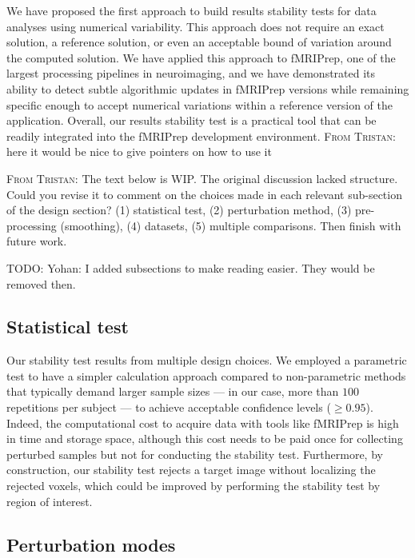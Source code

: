 \documentclass[lettersize,journal]{IEEEtran}
\newcommand{\TODO}[1]{\color{red}\textsc{TODO:} #1\color{black}\xspace}
\newcommand{\TG}[1]{\color{orange}\textsc{From Tristan:} #1\color{black}\xspace}
\newcommand{\fmriprep}{fMRIPrep\xspace}
\begin{document}

We have proposed the first approach to build results stability tests for data analyses using numerical variability. This approach does not require an exact solution, a reference solution, or even an acceptable bound of variation around the computed solution. We have applied this approach to \fmriprep, one of the largest processing pipelines in neuroimaging, and we have demonstrated its ability to detect subtle algorithmic updates in \fmriprep versions while remaining specific enough to accept numerical variations within a reference version of the application. Overall, our results stability test is a practical tool that can be readily integrated into the \fmriprep development environment. \TG{here it would be nice to give pointers on how to use it}

\TG{The text below is WIP. The original discussion lacked structure. Could you revise it to comment on the choices made in each relevant sub-section of the design section? (1) statistical test, (2) perturbation method, (3) pre-processing (smoothing), (4) datasets, (5) multiple comparisons. Then finish with future work.}

\TODO{Yohan: I added subsections to make reading easier. They would be removed then.}

\subsection*{Statistical test}

Our stability test results from multiple design choices.
We employed a parametric test to have a simpler calculation approach compared to non-parametric methods that typically demand larger sample sizes --- in our case, more than $100$ repetitions per subject --- to achieve acceptable confidence levels ($\geq 0.95$).
Indeed, the computational cost to acquire data with tools like \fmriprep is high in time and storage space, although this cost needs to be paid once for collecting perturbed samples but not for conducting the stability test.
Furthermore, by construction, our stability test rejects a target image without localizing the rejected voxels, which could be improved by performing the stability test by region of interest.

\subsection*{Perturbation modes}
\end{document}
